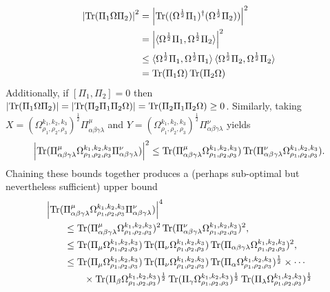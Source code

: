 \documentclass[notitlepage]{article}
\begin{document}
\begin{align}
    \left|\operatorname{Tr}(\Pi_1 \Omega \Pi_2)\right|^2 
    &= \left|\operatorname{Tr}((\Omega^{\frac{1}{2}}\Pi_1)^{\dagger}(\Omega^{\frac{1}{2}}\Pi_2))\right|^2 \\
    &= \left|\braket{\Omega^{\frac{1}{2}}\Pi_1, \Omega^{\frac{1}{2}}\Pi_2}\right|^{2} \\
    &\leq \braket{\Omega^{\frac{1}{2}}\Pi_1, \Omega^{\frac{1}{2}}\Pi_1}\braket{\Omega^{\frac{1}{2}}\Pi_2, \Omega^{\frac{1}{2}}\Pi_2} \\
    &= \operatorname{Tr}(\Pi_1 \Omega)\operatorname{Tr}(\Pi_2 \Omega)
\end{align}
Additionally, if $[\Pi_1, \Pi_2]=0$ then $\left|\operatorname{Tr}(\Pi_1 \Omega \Pi_2)\right| = \left|\operatorname{Tr}(\Pi_2\Pi_1\Pi_2\Omega)\right| = \operatorname{Tr}(\Pi_2\Pi_1\Pi_2\Omega) \geq 0$.
Similarly, taking $X = \left(\Omega_{\rho_1,\rho_2,\rho_3}^{k_1, k_2, k_3}\right)^{\frac{1}{2}}\Pi^{\mu}_{\alpha\beta\gamma\lambda}$ and $Y = \left(\Omega_{\rho_1,\rho_2,\rho_3}^{k_1, k_2, k_3}\right)^{\frac{1}{2}}\Pi^{\nu}_{\alpha\beta\gamma\lambda}$ yields
\begin{equation}
    \left|\operatorname{Tr}(\Pi^{\mu}_{\alpha\beta\gamma\lambda} \Omega_{\rho_1,\rho_2,\rho_3}^{k_1, k_2, k_3} \Pi^{\nu}_{\alpha\beta\gamma\lambda})\right|^{2} \leq \operatorname{Tr}(\Pi^{\mu}_{\alpha\beta\gamma\lambda}\Omega_{\rho_1,\rho_2,\rho_3}^{k_1, k_2, k_3})\operatorname{Tr}(\Pi^{\nu}_{\alpha\beta\gamma\lambda}\Omega_{\rho_1,\rho_2,\rho_3}^{k_1, k_2, k_3}).
\end{equation}
Chaining these bounds together produces a (perhaps sub-optimal but nevertheless sufficient) upper bound
\begin{align}
    &\left|\operatorname{Tr}(\Pi^{\mu}_{\alpha\beta\gamma\lambda} \Omega_{\rho_1,\rho_2,\rho_3}^{k_1, k_2, k_3} \Pi^{\nu}_{\alpha\beta\gamma\lambda})\right|^4\\
    &\qquad\leq \operatorname{Tr}(\Pi^{\mu}_{\alpha\beta\gamma\lambda}\Omega_{\rho_1,\rho_2,\rho_3}^{k_1, k_2, k_3})^2\operatorname{Tr}(\Pi^{\nu}_{\alpha\beta\gamma\lambda}\Omega_{\rho_1,\rho_2,\rho_3}^{k_1, k_2, k_3})^2, \\
    &\qquad\leq \operatorname{Tr}(\Pi_{\mu}\Omega_{\rho_1,\rho_2,\rho_3}^{k_1, k_2, k_3})\operatorname{Tr}(\Pi_{\nu}\Omega_{\rho_1,\rho_2,\rho_3}^{k_1, k_2, k_3})\operatorname{Tr}(\Pi_{\alpha\beta\gamma\lambda}\Omega_{\rho_1,\rho_2,\rho_3}^{k_1, k_2, k_3})^2, \\
    &\qquad\leq \operatorname{Tr}(\Pi_{\mu}\Omega_{\rho_1,\rho_2,\rho_3}^{k_1, k_2, k_3})\operatorname{Tr}(\Pi_{\nu}\Omega_{\rho_1,\rho_2,\rho_3}^{k_1, k_2, k_3})\operatorname{Tr}(\Pi_{\alpha}\Omega_{\rho_1,\rho_2,\rho_3}^{k_1, k_2, k_3})^{\frac{1}{2}}\times \cdots \\
    &\qquad\qquad\times \operatorname{Tr}(\Pi_{\beta}\Omega_{\rho_1,\rho_2,\rho_3}^{k_1, k_2, k_3})^{\frac{1}{2}}\operatorname{Tr}(\Pi_{\gamma}\Omega_{\rho_1,\rho_2,\rho_3}^{k_1, k_2, k_3})^{\frac{1}{2}}\operatorname{Tr}(\Pi_{\lambda}\Omega_{\rho_1,\rho_2,\rho_3}^{k_1, k_2, k_3})^{\frac{1}{2}}
\end{align}
\end{document}
